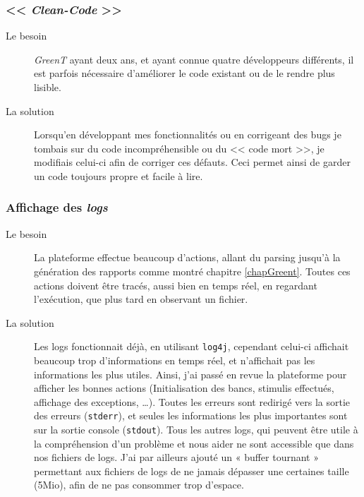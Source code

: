 	\subsubsection{<< \textit{Clean-Code} >>}
		\begin{description}
			\item[Le besoin] \textit{GreenT} ayant deux ans, et ayant connue quatre développeurs différents, il est parfois nécessaire d'améliorer le code existant ou de le rendre plus lisible. 
			\item[La solution] Lorsqu'en développant mes fonctionnalités ou en corrigeant des bugs je tombais sur du code incompréhensible ou du << code mort >>, je modifiais celui-ci afin de corriger ces défauts. Ceci permet ainsi de garder un code toujours propre et facile à lire.
		\end{description}
		
	\subsubsection{Affichage des \textit{logs}}
		\begin{description}
			\item[Le besoin] La plateforme effectue beaucoup d'actions, allant du parsing jusqu'à la génération des rapports comme montré chapitre \ref{chapGreent}. Toutes ces actions doivent être tracés, aussi bien en temps réel, en regardant l'exécution, que plus tard en observant un fichier.
			\item[La solution] Les logs fonctionnait déjà, en utilisant \texttt{log4j}, cependant celui-ci affichait beaucoup trop d'informations en temps réel, et n'affichait pas les informations les plus utiles. Ainsi, j'ai passé en revue la plateforme pour afficher les bonnes actions (Initialisation des bancs, stimulis effectués, affichage des exceptions, \ldots). Toutes les erreurs sont redirigé vers la sortie des erreurs (\texttt{stderr}), et seules les informations les plus importantes sont sur la sortie console (\texttt{stdout}). Tous les autres logs, qui peuvent être utile à la compréhension d'un problème et nous aider ne sont accessible que dans nos fichiers de logs. J'ai par ailleurs ajouté un « buffer tournant » permettant aux fichiers de logs de ne jamais dépasser une certaines taille (5Mio), afin de ne pas consommer trop d'espace.
		\end{description}
		

